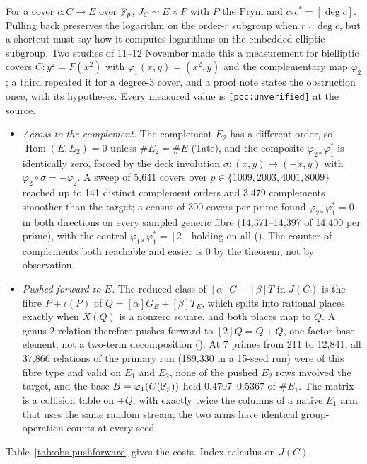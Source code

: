For a cover $c:C\to E$ over $\mathbb{F}_p$, $J_C\sim E\times P$ with $P$ the Prym and
$c_*c^*=[\deg c]$. Pulling back preserves the logarithm on the order-$r$
subgroup when $r\nmid\deg c$, but a shortcut must say how it computes
logarithms on the embedded elliptic subgroup. Two studies of 11--12
November made this a measurement for bielliptic covers
$C:y^2=F(x^2)$ with $\varphi_1(x,y)=(x^2,y)$ and the complementary map
$\varphi_2$; a third repeated it for a degree-3 cover, and a proof note
states the obstruction once, with its hypotheses. Every measured value is
\texttt{[pcc:unverified]} at the source.
\begin{itemize}
\item \emph{Across to the complement.} The complement $E_2$ has a
  different order, so $\operatorname{Hom}(E,E_2)=0$ unless $\#E_2=\#E$
  (Tate), and the composite $\varphi_{2*}\varphi_1^*$ is identically zero,
  forced by the deck involution $\sigma:(x,y)\mapsto(-x,y)$ with
  $\varphi_2\circ\sigma=-\varphi_2$. A sweep of 5{,}641 covers over
  $p\in\{1009,2003,4001,8009\}$ reached up to 141 distinct complement orders
  and 3{,}479 complements smoother than the target; a census of 300 covers
  per prime found $\varphi_{2*}\varphi_1^*=0$ in both directions on every
  sampled generic fibre (14{,}371--14{,}397 of 14{,}400 per prime), with the
  control $\varphi_{1*}\varphi_1^*=[2]$ holding on all
  (). The counter of
  complements both reachable and easier is 0 by the theorem, not by
  observation.
\item \emph{Pushed forward to $E$.} The reduced class of $[\alpha]G+[\beta]T$
  in $J(C)$ is the fibre $P+\iota(P)$ of $Q=[\alpha]G_E+[\beta]T_E$, which
  splits into rational places exactly when $X(Q)$ is a nonzero square, and
  both places map to $Q$. A genus-2 relation therefore pushes forward to
  $[2]Q=Q+Q$, one factor-base element, not a two-term decomposition
  (). At 7 primes
  from 211 to 12{,}841, all 37{,}866 relations of the primary run (189{,}330
  in a 15-seed run) were of this fibre type and valid on $E_1$ and $E_2$,
  none of the pushed $E_2$ rows involved the target, and the base
  $B=\varphi_1(C(\mathbb{F}_p))$ held $0.4707$--$0.5367$ of $\#E_1$. The matrix is a
  collision table on $\pm Q$, with exactly twice the columns of a native
  $E_1$ arm that uses the same random stream; the two arms have identical
  group-operation counts at every seed.
\end{itemize}
Table~\ref{tab:obs-pushforward} gives the costs. Index calculus on $J(C)$,
